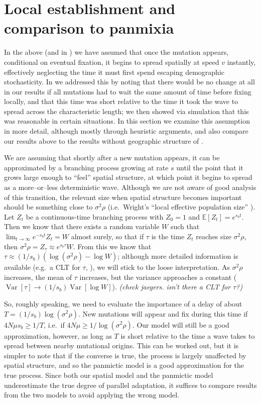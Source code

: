 \documentclass{article}
\newcommand{\plr}[1]{{\it\color{blue}(#1)}}
\newcommand{\var}{\mathop{\mbox{Var}}}
\newcommand{\E}{\mathbb{E}}
\begin{document}
\section{Local establishment and comparison to panmixia}

In the above (and in \citet{ralphcoop2010}) we have assumed that once the mutation appears,
conditional on eventual fixation, it begins to spread spatially at speed $v$ instantly,
effectively neglecting the time it must first spend escaping demographic stochasticity.
In \citet{ralphcoop2010} we addressed this by noting that there would be no change at all in our results 
if all mutations had to wait the same amount of time before fixing locally,
and that this time was short relative to the time it took the wave to spread across the characteristic length;
we then showed via simulation that this was reasonable in certain situations.
In this section we examine this assumption in more detail, although mostly through heuristic arguments,
and also compare our results above to the results without geographic structure of \citet{softsweeps}.

We are assuming that shortly after a new mutation appears, 
it can be approximated by a branching process growing at rate $s$
until the point that it grows large enough to ``feel'' spatial structure,
at which point it begins to spread as a more--or--less deterministic wave.
Although we are not aware of good analysis of this transition, 
the relevant size when spatial structure becomes important
should be something close to $\sigma^2 \rho$ 
(i.e.\ Wright's ``local effective population size'' \citep{XXX}).
Let $Z_t$ be a continuous-time branching process with $Z_0=1$ and $\E[Z_t] = e^{s_b t}$.
Then we know that there exists a random variable $W$ such that $\lim_{t\to\infty} e^{-s_b t} Z_t = W$ almost surely,
so that if $\tau$ is the time $Z_t$ reaches size $\sigma^2 \rho$, %
then $\sigma^2 \rho = Z_\tau \approx e^{s_b \tau} W$.
From this we know that $\tau \approx (1/s_b) (\log (\sigma^2 \rho) - \log W)$;
although more detailed information is available (e.g.\ a CLT for $\tau$, \citet{XXX}),
we will stick to the loose interpretation.
As $\sigma^2 \rho$ increases, the mean of $\tau$ increases, but the variance approaches a constant
($\var[\tau] \to (1/s_b) \var[\log W]$). \plr{check jaegers.  isn't there a CLT for $\tau$?}

So, roughly speaking, we need to evaluate the importance of a delay of about $T = (1/s_b) \log (\sigma^2 \rho)$.
New mutations will appear and fix during this time if $4N\mu s_b \ge 1/T$,
i.e.\ if $4 N \mu \ge 1/\log (\sigma^2 \rho)$.
Our model will still be a good approximation, however, 
as long as $T$ is short relative to the time a wave takes to spread between nearby mutational origins.
This can be worked out,
but it is simpler to note that if the converse is true, 
the process is largely unaffected by spatial structure,
and so the panmictic model is a good approximation for the true process.
Since both our spatial model and the panmictic model underestimate the true degree of parallel adaptation,
it suffices to compare results from the two models to avoid applying the wrong model.
\end{document}
